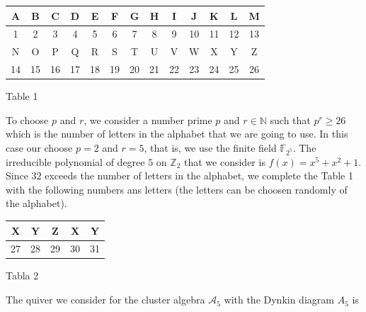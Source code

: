 \documentclass[12pt,a4paper]{article}
\begin{document}
\begin{center}
\begin{tabular}{||c|c|c|c|c|c|c|c|c|c|c|c|c||}
\hline \hline
A & B & C & D & E & F & G & H & I & J & K & L & M \\ 
\hline
1 & 2 & 3 & 4 & 5 & 6 & 7 & 8 & 9 & 10 & 11 & 12 & 13 \\ 
\hline \hline
 N & O & P & Q & R & S & T & U & V & W & X & Y & Z \\
\hline
14 & 15 & 16 & 17 & 18 & 19 & 20 & 21 & 22 & 23 & 24 & 25 & 26\\
\hline \hline 
\end{tabular}

\vspace{0.3cm}

Table 1

\end{center}

To choose $p$ and $r$, we consider a number prime $p$ and $r \in \mathbb{N}$ such that $p^r \geq 26$ which is the number of letters in the alphabet that we are going to use. In this case our choose $p=2$ and $r=5$, that is, we use the finite field $\mathbb{F}_{2^5}$. The irreducible polynomial of degree $5$ on $\mathbb{Z}_2$ that  we consider is $f(x)=x^5+x^2+1$. Since $32$ exceeds the number of letters in the alphabet, we complete the Table 1 with the following numbers ans letters (the letters can be  choosen randomly of the alphabet). 

\begin{center}
\begin{tabular}{||c|c|c|c|c||}
\hline \hline
X & Y & Z & X & Y   \\ 
\hline
27 & 28 & 29 & 30 & 31  \\ 
\hline \hline 
\end{tabular}

\vspace{0.3cm}

Tabla 2

\end{center}

The quiver we consider for the cluster algebra $\mathcal{A}_5$ with the Dynkin diagram $A_5$ is

\begin{center}
\hspace{0.5cm}
\end{center}
\end{document}
